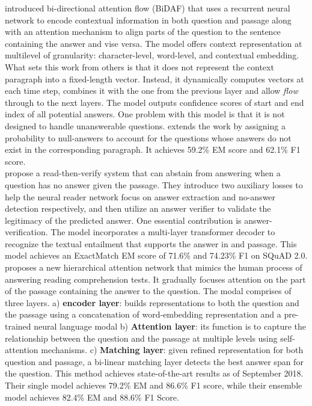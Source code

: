 \citep{DBLP:journals/corr/SeoKFH16} introduced bi-directional attention flow (BiDAF) that uses a recurrent neural network to encode contextual information in both question and passage along with an attention mechanism to align parts of the question to the sentence containing the answer and vise versa. The model offers context representation at multilevel of granularity: character-level, word-level, and contextual embedding. What sets this work from others is that it does not represent the context paragraph into a fixed-length vector. Instead, it dynamically computes vectors at each time step, combines it with the one from the previous layer and allow \textit{flow} through to the next layers. The model outputs confidence scores of start and end index of all potential answers. One problem with this model is that it is not designed to handle unanswerable questions. \citep{DBLP:journals/corr/LevySCZ17} extends the work by assigning a probability to null-answers to account for the questions whose answers do not exist in the corresponding paragraph. It achieves 59.2\% EM score and 62.1\% F1 score.\\

\citep{DBLP:journals/corr/abs-1808-05759} propose a read-then-verify system that can abstain from answering when a question has no answer given the passage. They introduce two auxiliary losses to help the neural reader network focus on answer extraction and no-answer detection respectively, and then utilize an answer verifier to validate the legitimacy of the predicted answer. One essential contribution is answer-verification. The model incorporates a multi-layer transformer decoder to recognize the textual entailment that supports the answer in and passage. This model achieves an ExactMatch EM score of 71.6\% and 74.23\% F1 on SQuAD 2.0. \\

\citep{DBLP:journals/corr/abs-1811-11934} proposes a new hierarchical attention network that mimics the human process of answering reading comprehension tests. It gradually focuses attention on the part of the passage containing the answer to the question. The modal comprises of three layers. a) \textbf{encoder layer}: builds representations to both the question and the passage using a concatenation of word-embedding representation \citep{pennington2014glove} and a pre-trained neural language modal \citep{Peters:2018} b) \textbf{Attention layer}: its function is to capture the relationship between the question and the passage at multiple levels using self-attention mechanisms. c) \textbf{Matching layer}: given refined representation for both question and passage, a bi-linear matching layer detects the best answer span for the question. This method achieves state-of-the-art results as of September 2018. Their single model achieves 79.2\% EM and 86.6\% F1 score, while their ensemble model achieves 82.4\% EM and 88.6\% F1 Score. \\

